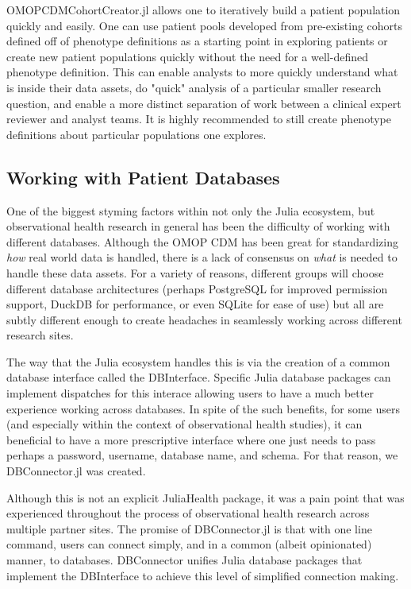 \documentclass{juliacon}
\begin{document}
OMOPCDMCohortCreator.jl allows one to iteratively build a patient population quickly and easily.
One can use patient pools developed from pre-existing cohorts defined off of phenotype definitions as a starting point in exploring patients or create new patient populations quickly without the need for a well-defined phenotype definition.
This can enable analysts to more quickly understand what is inside their data assets, do "quick" analysis of a particular smaller research question, and enable a more distinct separation of work between a clinical expert reviewer and analyst teams.
It is highly recommended to still create phenotype definitions about particular populations one explores.


\subsection{Working with Patient Databases}

One of the biggest styming factors within not only the Julia ecosystem, but observational health research in general has been the difficulty of working with different databases.
Although the OMOP CDM has been great for standardizing \textit{how} real world data is handled, there is a lack of consensus on \textit{what} is needed to handle these data assets.
For a variety of reasons, different groups will choose different database architectures (perhaps PostgreSQL for improved permission support, DuckDB for performance, or even SQLite for ease of use) but all are subtly different enough to create headaches in seamlessly working across different research sites.

The way that the Julia ecosystem handles this is via the creation of a common database interface called the DBInterface.
Specific Julia database packages can implement dispatches for this interace allowing users to have a much better experience working across databases.
In spite of the such benefits, for some users (and especially within the context of observational health studies), it can beneficial to have a more prescriptive interface where one just needs to pass perhaps a password, username, database name, and schema.
For that reason, we DBConnector.jl was created.

Although this is not an explicit JuliaHealth package, it was a pain point that was experienced throughout the process of observational health research across multiple partner sites.
The promise of DBConnector.jl is that with one line command, users can connect simply, and in a common (albeit opinionated) manner, to databases.
DBConnector unifies Julia database packages that implement the DBInterface to achieve this level of simplified connection making.
\end{document}
